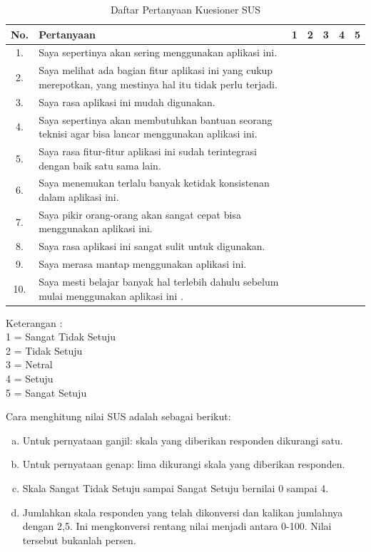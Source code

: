 	\begin{longtable}{ |c|p{6cm}|c|c|c|c|c| }
		\caption{Daftar Pertanyaan Kuesioner SUS}
		\label{kuesioner} \\ 
		\hline
		No. & Pertanyaan & 1 & 2 & 3 & 4 & 5 \\
		\hline
		1. & Saya sepertinya akan sering menggunakan aplikasi ini. & & & & & \\
		\hline
		2.  & Saya melihat ada bagian fitur aplikasi ini yang cukup merepotkan, yang mestinya hal itu tidak perlu terjadi.
		& & & & &\\
		\hline
		3. & Saya rasa aplikasi ini mudah digunakan. & & & & & \\
		\hline
		4. & Saya sepertinya akan membutuhkan bantuan seorang teknisi agar bisa lancar menggunakan aplikasi ini.
		& & & & & \\
		\hline
		5. & Saya rasa fitur-fitur aplikasi ini sudah terintegrasi dengan baik satu sama lain.
		& & & & & \\
		\hline
		6. & Saya menemukan terlalu banyak ketidak konsistenan dalam aplikasi ini.
		& & & & & \\
		\hline
		7. & Saya pikir orang-orang akan sangat cepat bisa menggunakan aplikasi ini.
		& & & & & \\
		\hline
		8. & Saya rasa aplikasi ini sangat sulit untuk digunakan. & & & & & \\
		\hline
		9. & Saya merasa mantap menggunakan aplikasi ini.  & & & & & \\
		\hline
		10. & Saya mesti belajar banyak hal terlebih dahulu sebelum mulai menggunakan aplikasi ini
		.
		& & & & & \\
		\hline
	\end{longtable}
Keterangan : 
\\ 1 = Sangat Tidak Setuju
\\ 2 = Tidak Setuju
\\ 3 = Netral
\\ 4 = Setuju
\\ 5 = Sangat Setuju

 Cara menghitung nilai SUS adalah sebagai berikut:
\begin{enumerate}[a.]
	\item  Untuk pernyataan ganjil: skala yang diberikan responden dikurangi satu.
	\item Untuk pernyataan genap: lima dikurangi skala yang diberikan responden.
	\item Skala Sangat Tidak Setuju sampai Sangat Setuju bernilai 0 sampai 4.
	\item Jumlahkan skala responden yang telah dikonversi dan kalikan jumlahnya dengan 2,5. Ini mengkonversi rentang nilai menjadi antara 0-100. Nilai tersebut bukanlah persen.
\end{enumerate}

